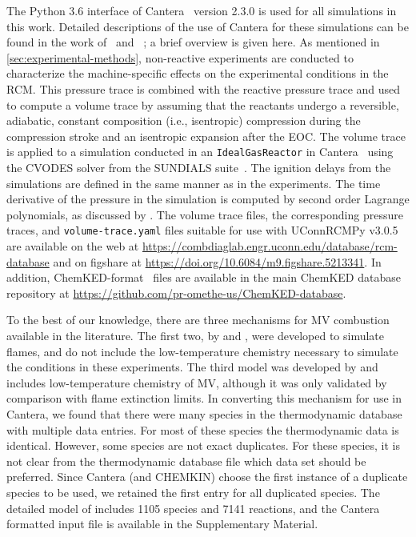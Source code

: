 \documentclass[letterpaper, review, sort&compress]{elsarticle}
\begin{document}
The Python 3.6 interface of Cantera~\cite{cantera} version 2.3.0 is used for all simulations in this
work. Detailed descriptions of the use of Cantera for these simulations can be found in the work
of~\citet{Weber2016a} and~ \citet{Dames2016}; a brief overview is given here. As mentioned in
\cref{sec:experimental-methods}, non-reactive experiments are conducted to characterize the
machine-specific effects on the experimental conditions in the RCM. This pressure trace is combined
with the reactive pressure trace and used to compute a volume trace by assuming that the reactants
undergo a reversible, adiabatic, constant composition (i.e., isentropic) compression during the
compression stroke and an isentropic expansion after the EOC. The volume trace is applied to a
simulation conducted in an \verb|IdealGasReactor| in Cantera~\cite{cantera} using the CVODES solver
from the SUNDIALS suite~\cite{Hindmarsh2005}. The ignition delays from the simulations are defined
in the same manner as in the experiments. The time derivative of the pressure in the simulation is
computed by second order Lagrange polynomials, as discussed by \citet{Chapra2010}. The volume trace
files, the corresponding pressure traces, and \texttt{volume-trace.yaml} files suitable for use with
UConnRCMPy v3.0.5~\cite{uconnrcmpy} are available on the web at
\url{https://combdiaglab.engr.uconn.edu/database/rcm-database} and on figshare at
\url{https://doi.org/10.6084/m9.figshare.5213341}. In addition, ChemKED-format~\cite{Weber2017}
files are available in the main ChemKED database repository at
\url{https://github.com/pr-omethe-us/ChemKED-database}.


To the best of our knowledge, there are three mechanisms for MV combustion available in the
literature. The first two, by \citet{Korobeinichev2015} and \citet{Dmitriev2015}, were developed to
simulate flames, and do not include the low-temperature chemistry necessary to simulate the
conditions in these experiments. The third model was developed by \citet{Dievart2013} and includes
low-temperature chemistry of MV, although it was only validated by comparison with flame extinction
limits. In converting this mechanism for use in Cantera, we found that there were many species in
the thermodynamic database with multiple data entries. For most of these species the thermodynamic
data is identical. However, some species are not exact duplicates. For these species, it is not
clear from the thermodynamic database file which data set should be preferred. Since Cantera (and
CHEMKIN) choose the first instance of a duplicate species to be used, we retained the first entry
for all duplicated species. The detailed model of \citet{Dievart2013} includes 1105 species and 7141
reactions, and the Cantera formatted input file is available in the Supplementary Material.
\end{document}
